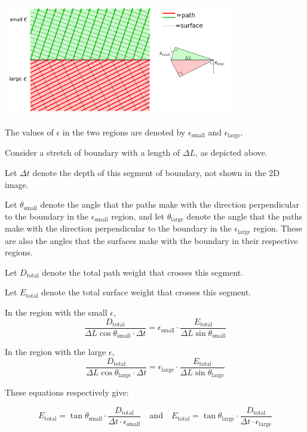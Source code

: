 \begin{center}
\includegraphics[width = 0.75\textwidth]{Duality/refraction}
\end{center}

The values of \(\epsilon\) in the two regions are denoted by \(\epsilon_{\text{small}}\) and \(\epsilon_{\text{large}}\).

Consider a stretch of boundary with a length of \(\Delta L\), as depicted above. 

Let \(\Delta t\) denote the depth of this segment of boundary, not shown in the 2D image. 

Let \(\theta_{\text{small}}\) denote the angle that the paths make with the direction perpendicular to the boundary in the \(\epsilon_{\text{small}}\) region, and let \(\theta_{\text{large}}\) denote the angle that the paths make with the direction perpendicular to the boundary in the \(\epsilon_{\text{large}}\) region. These are also the angles that the surfaces make with the boundary in their respective regions.

Let \(D_{\text{total}}\) denote the total path weight that crosses this segment. 

Let \(E_{\text{total}}\) denote the total surface weight that crosses this segment. 

In the region with the small \(\epsilon\), 
\[\frac{D_{\text{total}}}{\Delta L\cos\theta_{\text{small}} \cdot \Delta t} = \epsilon_{\text{small}} \cdot \frac{E_{\text{total}}}{\Delta L\sin\theta_{\text{small}}}\] 

In the region with the large \(\epsilon\), 
\[\frac{D_{\text{total}}}{\Delta L\cos\theta_{\text{large}} \cdot \Delta t} = \epsilon_{\text{large}} \cdot \frac{E_{\text{total}}}{\Delta L\sin\theta_{\text{large}}}\] 

These equations respectively give: 

\[E_{\text{total}} = \tan\theta_{\text{small}} \cdot \frac{D_{\text{total}}}{\Delta t \cdot \epsilon_{\text{small}}} \quad\text{and}\quad E_{\text{total}} = \tan\theta_{\text{large}} \cdot \frac{D_{\text{total}}}{\Delta t \cdot \epsilon_{\text{large}}}\]


